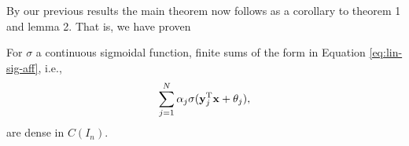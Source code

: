 \documentclass[11pt,letterpaper]{beamer}
\begin{document}
\begin{frame}
  By our previous results the main theorem now follows as a corollary to theorem
  1 and lemma 2. That is, we have proven
  \begin{theorem}
    For $\sigma$ a continuous sigmoidal function, finite sums of the form in
    Equation \eqref{eq:lin-sig-aff}, i.e.,
    \[
      \sum_{j=1}^N \alpha_j\sigma(\mathbf{y}_j^{\mathrm{T}}\mathbf{x}+\theta_j),
    \]
  are dense in $C(I_n)$.
  \end{theorem}
\end{frame}
\end{document}
